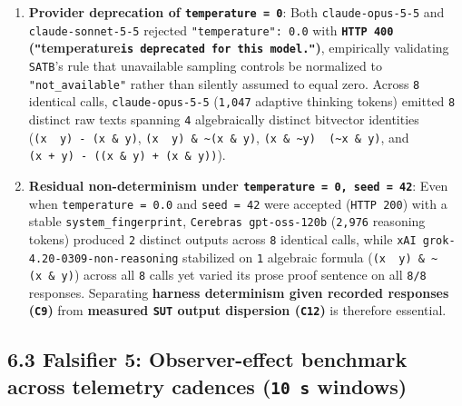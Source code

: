 \documentclass[10pt,letterpaper]{article}
\providecommand{\tightlist}{\setlength{\itemsep}{1pt}\setlength{\parskip}{0pt}}
\begin{document}
\begin{enumerate}
\def\labelenumi{\arabic{enumi}.}
\tightlist
\item
  \textbf{Provider deprecation of \texttt{temperature\ =\ 0}}: Both
  \texttt{claude-\allowbreak{}opus-\allowbreak{}5-\allowbreak{}5} and \texttt{claude-\allowbreak{}sonnet-\allowbreak{}5-\allowbreak{}5} rejected
  \texttt{"temperature":\ 0.\allowbreak{}0} with \textbf{\texttt{HTTP\ 400}
  (\texttt{"}temperature\texttt{is\ deprecated\ for\ this\ model.\allowbreak{}"})},
  empirically validating \texttt{SATB}'s rule that unavailable sampling
  controls be normalized to \texttt{"not\_\allowbreak{}available"} rather than
  silently assumed to equal zero. Across \texttt{8} identical calls,
  \texttt{claude-\allowbreak{}opus-\allowbreak{}5-\allowbreak{}5} (\texttt{1,047} adaptive thinking tokens)
  emitted \texttt{8} distinct raw texts spanning \texttt{4}
  algebraically distinct bitvector identities
  (\texttt{(x\ \textbar{}\ y)\ -\ (x\ \&\ y)},
  \texttt{(x\ \textbar{}\ y)\ \&\ \textasciitilde{}(x\ \&\ y)},
  \texttt{(x\ \&\ \textasciitilde{}y)\ \textbar{}\ (\textasciitilde{}x\ \&\ y)},
  and \texttt{(\allowbreak{}x\ +\ y)\ -\allowbreak{}\ (\allowbreak{}(\allowbreak{}x\ \&\ y)\ +\ (\allowbreak{}x\ \&\ y))}).
\item
  \textbf{Residual non-determinism under
  \texttt{temperature\ =\ 0,\allowbreak{}\ seed\ =\ 42}}: Even when
  \texttt{temperature\ =\ 0.\allowbreak{}0} and \texttt{seed\ =\ 42} were accepted
  (\texttt{HTTP\ 200}) with a stable \texttt{system\_\allowbreak{}fingerprint},
  \texttt{Cerebras\ gpt-\allowbreak{}oss-\allowbreak{}120b} (\texttt{2,976} reasoning tokens)
  produced \texttt{2} distinct outputs across \texttt{8} identical
  calls, while \texttt{xAI\ grok-\allowbreak{}4.\allowbreak{}20-\allowbreak{}0309-\allowbreak{}non-\allowbreak{}reasoning} stabilized on
  \texttt{1} algebraic formula
  (\texttt{(x\ \textbar{}\ y)\ \&\ \textasciitilde{}(x\ \&\ y)}) across
  all \texttt{8} calls yet varied its prose proof sentence on all
  \texttt{8/8} responses. Separating \textbf{harness determinism given
  recorded responses (\texttt{C9})} from \textbf{measured \texttt{SUT}
  output dispersion (\texttt{C12})} is therefore essential.
\end{enumerate}

\subsection{\texorpdfstring{6.3 Falsifier 5: Observer-effect benchmark
across telemetry cadences (\texttt{10\ s}
windows)}{6.3 Falsifier 5: Observer-effect benchmark across telemetry cadences (10 s windows)}}\label{falsifier-5-observer-effect-benchmark-across-telemetry-cadences-10-s-windows}
\end{document}
